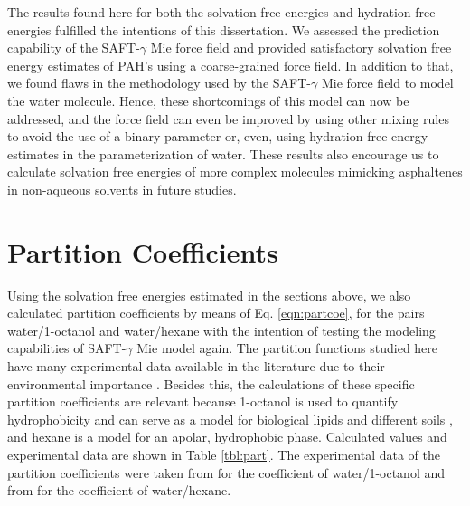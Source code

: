 The results found here for both the solvation free energies and hydration free energies fulfilled the intentions of this dissertation. We assessed the prediction capability of the SAFT-$\gamma$ Mie force field and provided satisfactory solvation free energy estimates of PAH's using a coarse-grained force field. In addition to that, we found flaws in the methodology used by the SAFT-$\gamma$ Mie force field to model the water molecule. Hence, these shortcomings of this model can now be addressed, and the force field can even be improved by using other mixing rules to avoid the use of a binary parameter or, even, using hydration free energy estimates in the parameterization of water. These results also encourage us to calculate solvation free energies of more complex molecules mimicking asphaltenes in non-aqueous solvents in future studies.  

\section{Partition Coefficients}

Using the solvation free energies estimated in the sections above, we also calculated partition coefficients by means of Eq. \eqref{eqn:partcoe}, for the pairs  water/1-octanol and water/hexane with the intention of testing the modeling capabilities of SAFT-$\gamma$ Mie model again. The partition functions studied here have many experimental data available in the literature due to their environmental importance \cite{sangster}. Besides this, the calculations of these specific partition coefficients are relevant because   1-octanol is used to quantify hydrophobicity and can serve as a model for biological lipids and different soils \cite{RUELLE2000457}, and hexane is a model for an apolar, hydrophobic phase. Calculated values and experimental data are shown in Table \ref{tbl:part}. The experimental data of the partition coefficients were taken from    for the coefficient of water/1-octanol and from  for the coefficient of water/hexane. 

